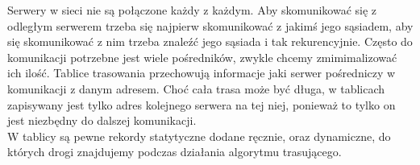 Serwery w sieci nie są połączone każdy z każdym. Aby skomunikować się z odległym serwerem trzeba się najpierw skomunikować z jakimś jego sąsiadem, aby się skomunikować z nim trzeba znaleźć jego sąsiada i tak rekurencyjnie. Często do komunikacji potrzebne jest wiele pośredników, zwykle chcemy zmimimalizować ich ilość. Tablice trasowania przechowują informacje jaki serwer pośredniczy w komunikacji z danym adresem. Choć cała trasa może być długa, w tablicach zapisywany jest tylko adres kolejnego serwera na tej niej, ponieważ to tylko on jest niezbędny do dalszej komunikacji. \\ 
W tablicy są pewne rekordy statytyczne dodane ręcznie, oraz dynamiczne, do których drogi znajdujemy podczas działania algorytmu trasującego.
